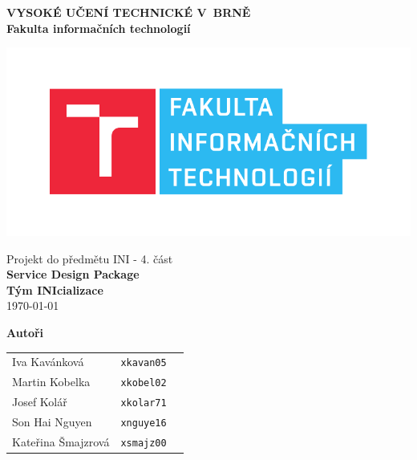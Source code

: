 \begin{titlepage}

    \centering

    {\fontsize{20pt}{15pt}\bfseries
    VYSOKÉ UČENÍ TECHNICKÉ V~BRNĚ\\
    \vspace{8pt}
    Fakulta informačních technologií
    }


    \includegraphics[scale=0.7]{./assets/fit-logo.pdf}

    \vspace{22pt}

    {\Large Projekt do předmětu INI - 4. část\\}
    \vspace{4pt}
    {\LARGE \bfseries Service Design Package\\}
    \vspace{90pt}
    {\Large \bfseries Tým INIcializace\\}
    \vspace{90pt}
    {\Large \today}

    \vspace{90pt}
    {\Large \bfseries Autoři\\}
    \vspace{12pt}

    \begin{tabular}{ l c r }
        Iva Kavánková & \texttt{xkavan05} \\
        Martin Kobelka & \texttt{xkobel02} \\
        Josef Kolář & \texttt{xkolar71} \\
        Son Hai Nguyen & \texttt{xnguye16} \\
        Kateřina Šmajzrová & \texttt{xsmajz00} \\
    \end{tabular}\\

\end{titlepage}